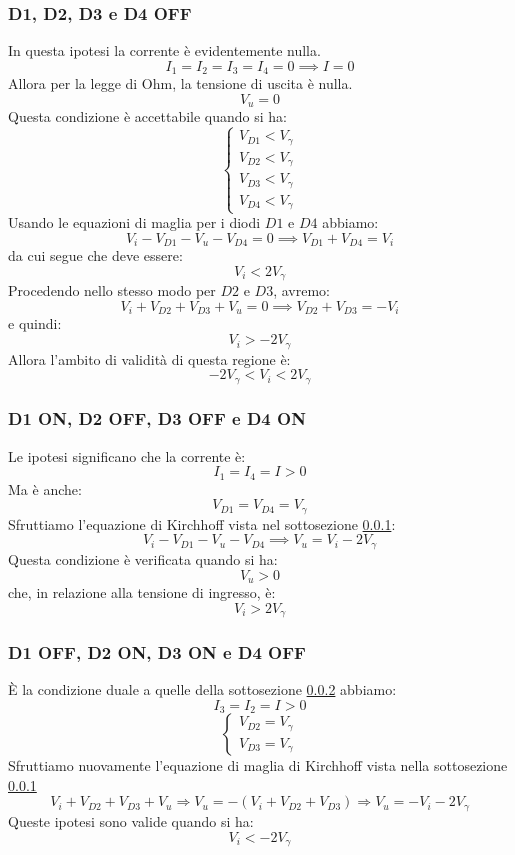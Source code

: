 \documentclass{article}
\numberwithin{equation}{subsection}
\begin{document}
	\subsubsection{D1, D2, D3 e D4 OFF}
	\label{subsub:raddr-sopp-sem-off-off-off-off}
	In questa ipotesi la corrente è evidentemente nulla.
	$$I_1 = I_2 = I_3 = I_4 = 0 \implies I = 0$$
	Allora per la legge di Ohm, la tensione di uscita è nulla.
	$$V_u = 0$$
	Questa condizione è accettabile quando si ha:
	$$\begin{cases} V_{D1} < V_\gamma \\ V_{D2} < V_\gamma \\ V_{D3} < V_\gamma \\ V_{D4} < V_\gamma \end{cases}$$
	Usando le equazioni di maglia per i diodi $D1$ e $D4$ abbiamo:
	$$V_i - V_{D1} - V_u - V_{D4} = 0 \implies V_{D1} + V_{D4} = V_i$$
	da cui segue che deve essere:
	$$V_i < 2V_\gamma$$
	Procedendo nello stesso modo per $D2$ e $D3$, avremo:
	$$V_i + V_{D2} + V_{D3} + V_u = 0 \implies V_{D2} + V_{D3} = -V_i$$
	e quindi:
	$$V_i > -2V_\gamma$$
	Allora l’ambito di validità di questa regione è:
	$$-2V_\gamma < V_i < 2V_\gamma$$
	\subsubsection{D1 ON, D2 OFF, D3 OFF e D4 ON}
	\label{subsub:raddr-sopp-sem-on-off-off-on}
	Le ipotesi significano che la corrente è:
	$$I_1 = I_4 = I > 0$$
	Ma è anche:
	$$V_{D1} = V_{D4} = V_\gamma$$
	Sfruttiamo l’equazione di Kirchhoff vista nel sottosezione \ref{subsub:raddr-sopp-sem-off-off-off-off}:
	$$V_i - V_{D1} - V_u - V_{D4} \implies V_u = V_i - 2V_\gamma$$
	Questa condizione è verificata quando si ha:
	$$V_u > 0$$
	che, in relazione alla tensione di ingresso, è:
	$$V_i > 2V_\gamma$$
	\subsubsection{D1 OFF, D2 ON, D3 ON e D4 OFF}
	\label{subsub:raddr-sopp-sem-off-on-on-off}
	È la condizione duale a quelle della sottosezione \ref{subsub:raddr-sopp-sem-on-off-off-on} abbiamo:
	$$I_3 = I_2 = I > 0$$
	$$\begin{cases} V_{D2} = V_\gamma \\ V_{D3} = V_\gamma \end{cases}$$
	Sfruttiamo nuovamente l’equazione di maglia di Kirchhoff vista nella sottosezione \ref{subsub:raddr-sopp-sem-off-off-off-off}
	$$V_i + V_{D2} + V_{D3} + V_u \Longrightarrow V_u = -(V_i + V_{D2} + V_{D3}) \Longrightarrow V_u = -V_i - 2V_\gamma$$
	Queste ipotesi sono valide quando si ha:
	$$V_i < -2V_\gamma$$
\end{document}
